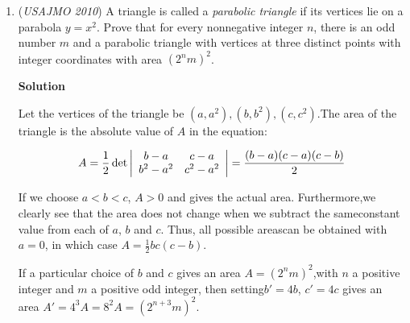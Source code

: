 \begin{enumerate}
 Since $m\angle YTA + m\angle YPA = 90^\circ + 90^\circ = 180^\circ$ and $m \angle YTB + m \angle YSB = 90^\circ + 90^\circ = 180^\circ$, we know that $TAPY$ and $TBSY$ are cyclic quadrilaterals. 

 We use this fact to get 
 \[\angle PTS=\angle PTY+\angle YTS=\angle PAY+\angle YBS=\angle XAY+\angle YBZ. \space \space (1)\] \\Now note that $\angle XAY$ is the inscribed angle of minor arc $\overset{\huge\frown}{PY}$, and $\angle XOY$ is the central angle of minor arc $\overset{\huge\frown}{AB}$, so $\angle XAY = \frac{\overset{\huge\frown}{PY}}{2} = \frac{\angle XOY}{2}$. Similarly, $\angle YBZ = \frac{\overset{\huge\frown}{YZ}}{2}=\frac{\angle YOZ}{2}$. Thus we can say 
 \[\angle XAY + \angle YBZ = \frac{\angle XOY}{2} + \frac{\angle YOZ}{2}=\frac{\angle XOY + \angle YOZ}{2} = \frac{\angle XOZ}{2}. \space \space (2)\] 

 
Combining statements $(1)$ and $(2)$, we can say that $\angle PTS = \frac{\angle XOZ}{2}$, as desired. $\square$



	\item (\textit{USAJMO 2010}) A triangle is called a \textit{parabolic triangle} if its vertices lie on a parabola $y = x^2$. Prove that for every nonnegative integer $n$, there is an odd number $m$ and a parabolic triangle with vertices at three distinct points with integer coordinates with area $(2^nm)^2$.


 



\textbf{Solution}

Let the vertices of the triangle be $(a, a^2), (b, b^2), (c, c^2)$.The area of the triangle is the absolute value of $A$ in the equation:

 
 \[A = \frac{1}{2}\det\left\vert         \begin{array}{c c}                 b-a & c - a\\                 b^2 - a^2 & c^2 - a^2         \end{array}\right\vert   = \frac{(b-a)(c-a)(c-b)}{2}\]

 

 If we choose $a < b < c$, $A > 0$ and gives the actual area. Furthermore,we clearly see that the area does not change when we subtract the sameconstant value from each of $a$, $b$ and $c$. Thus, all possible areascan be obtained with $a = 0$, in which case $A = \frac{1}{2}bc(c-b)$.

 If a particular choice of $b$ and $c$ gives an area $A = (2^nm)^2$,with $n$ a positive integer and $m$ a positive odd integer, then setting$b' = 4b$, $c' = 4c$ gives an area $A' = 4^3 A = 8^2 A = (2^{n+3}m)^2$.


\end{enumerate}
